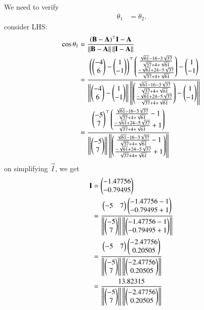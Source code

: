\documentclass[journal,12pt,twocolumn]{IEEEtran}
\theoremstyle{remark}
\begin{document}
We need to verify \begin{align}\theta_1 &= \theta_2.\end{align}
consider LHS:
\begin{align} 
\cos{\theta_1} &= \frac{(\mathbf{B} - \mathbf{A})^{\top}\mathbf{I} - \mathbf{A}}{\left\lVert\mathbf{B} - \mathbf{A}\right\rVert \left\lVert \mathbf{I} - \mathbf{A}\right\rVert}\\
 &= \frac{\left(\begin{pmatrix}-4\\6\end{pmatrix} - \begin{pmatrix}1\\-1\end{pmatrix}\right)^{\top}\begin{pmatrix}\frac{{\sqrt{61}-16-3\sqrt{37}}}{\sqrt{37}+4+\sqrt{61}}\\\frac{{-\sqrt{61}+24-5\sqrt{37}}}{\sqrt{37}+4+\sqrt{61}}\end{pmatrix} - \begin{pmatrix}1\\-1\end{pmatrix}}{\left\lVert\begin{pmatrix}-4\\6\end{pmatrix} - \begin{pmatrix}1\\-1\end{pmatrix}\right\rVert \left\lVert \begin{pmatrix}\frac{{\sqrt{61}-16-3\sqrt{37}}}{\sqrt{37}+4+\sqrt{61}}\\\frac{{-\sqrt{61}+24-5\sqrt{37}}}{\sqrt{37}+4+\sqrt{61}}\end{pmatrix} - \begin{pmatrix}1\\-1\end{pmatrix}\right\rVert}\\
 &= \frac{\begin{pmatrix}-5\\7\end{pmatrix}^{\top}\begin{pmatrix}\frac{{\sqrt{61}-16-3\sqrt{37}}}{\sqrt{37}+4+\sqrt{61}}-1\\\frac{{-\sqrt{61}+24-5\sqrt{37}}}{\sqrt{37}+4+\sqrt{61}}+1\end{pmatrix}}{\left\lVert\begin{pmatrix}-5\\7\end{pmatrix}\right\rVert \left\lVert \begin{pmatrix}\frac{{\sqrt{61}-16-3\sqrt{37}}}{\sqrt{37}+4+\sqrt{61}}-1\\\frac{{-\sqrt{61}+24-5\sqrt{37}}}{\sqrt{37}+4+\sqrt{61}}+1\end{pmatrix}\right\rVert}
\end{align}
on simplifying $\vec{I}$, we get
\begin{align}
\mathbf{I} &= \begin{pmatrix}-1.47756\\-0.79495\end{pmatrix}\\
&= \frac{\begin{pmatrix}-5&7\end{pmatrix}\begin{pmatrix}-1.47756-1\\-0.79495+1\end{pmatrix}}{\left\lVert\begin{pmatrix}-5\\7\end{pmatrix}\right\rVert \left\lVert \begin{pmatrix}-1.47756-1\\-0.79495+1\end{pmatrix}\right\rVert}\\
&= \frac{\begin{pmatrix}-5&7\end{pmatrix}\begin{pmatrix}-2.47756\\0.20505\end{pmatrix}}{\left\lVert\begin{pmatrix}-5\\7\end{pmatrix}\right\rVert \left\lVert \begin{pmatrix}-2.47756\\0.20505\end{pmatrix}\right\rVert}\\
&= \frac{13.82315}{\left\lVert\begin{pmatrix}-5\\7\end{pmatrix}\right\rVert \left\lVert\begin{pmatrix}-2.47756\\0.20505\end{pmatrix}\right\rVert}
\end{align}
\end{document}
